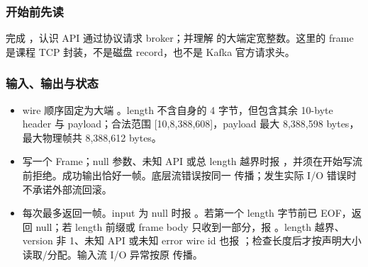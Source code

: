 \subsubsection*{开始前先读}
完成 ，认识 API 通过协议请求 broker；并理解  的大端定宽整数。这里的 frame 是课程 TCP 封装，不是磁盘 record，也不是 Kafka 官方请求头。
\subsubsection*{输入、输出与状态}
\begin{itemize}
\item wire 顺序固定为大端 。length 不含自身的 4 字节，但包含其余 10-byte header 与 payload；合法范围 [10,8,388,608]，payload 最大 8,388,598 bytes，最大物理帧共 8,388,612 bytes。
\item {} 写一个 Frame；null 参数、未知 API 或总 length 越界时报 ，并须在开始写流前拒绝。成功输出恰好一帧。底层流错误按同一  传播；发生实际 I/O 错误时不承诺外部流回滚。
\item {} 每次最多返回一帧。input 为 null 时报 。若第一个 length 字节前已 EOF，返回 null；若 length 前缀或 frame body 只收到一部分，报 。length 越界、version 非 1、未知 API 或未知 error wire id 也报 ；检查长度后才按声明大小读取/分配。输入流 I/O 异常按原  传播。
\end{itemize}
